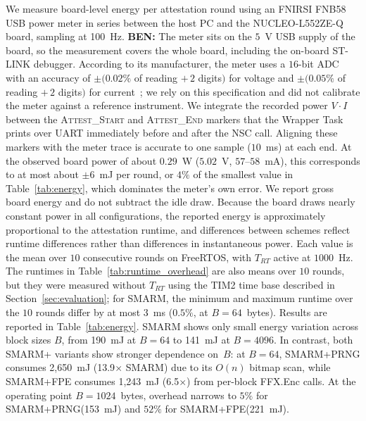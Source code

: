 \documentclass{ieeeaccess}
\DeclareRobustCommand{\ben}[1]{{\color{BENcolor}\textbf{BEN:} #1}}
\newcommand{\rtsmarm}{SMARM+\xspace}
\newcommand{\rtsmarmone}{SMARM+PRNG\xspace}
\newcommand{\rtsmarmtwo}{SMARM+FPE\xspace}
\begin{document}
We measure board-level energy per attestation round using 
an FNIRSI FNB58 USB power meter in series between the host 
PC and the NUCLEO-L552ZE-Q board, sampling at 100~Hz. 
\ben{The meter sits on the $5$~V USB supply of the board, so the measurement covers the whole board, including the on-board ST-LINK debugger.
According to its manufacturer, the meter uses a $16$-bit ADC with an accuracy of $\pm(0.02\%$ of reading $+\,2$ digits$)$ for voltage and $\pm(0.05\%$ of reading $+\,2$ digits$)$ for current~\cite{fnb58}; we rely on this specification and did not calibrate the meter against a reference instrument.
We integrate the recorded power $V \cdot I$ between the \textsc{Attest\_Start} and \textsc{Attest\_End} markers that the Wrapper Task prints over UART immediately before and after the NSC call.
Aligning these markers with the meter trace is accurate to one sample ($10$~ms) at each end.
At the observed board power of about $0.29$~W ($5.02$~V, $57$--$58$~mA), this corresponds to at most about $\pm 6$~mJ per round, or $4\%$ of the smallest value in Table~\ref{tab:energy}, which dominates the meter's own error.
We report gross board energy and do not subtract the idle draw.
Because the board draws nearly constant power in all configurations, the reported energy is approximately proportional to the attestation runtime, and differences between schemes reflect runtime differences rather than differences in instantaneous power.
Each value is the mean over $10$ consecutive rounds on FreeRTOS, with $T_{RT}$ active at $1000$~Hz.
The runtimes in Table~\ref{tab:runtime_overhead} are also means over $10$ rounds, but they were measured without $T_{RT}$ using the TIM2 time base described in Section~\ref{sec:evaluation}; for SMARM, the minimum and maximum runtime over the $10$ rounds differ by at most $3$~ms ($0.5\%$, at $B = 64$~bytes).}
%
Results are reported in Table~\ref{tab:energy}.
SMARM shows only small energy variation across block sizes $B$, from 190~mJ at $B=64$ to 141~mJ at $B=4096$.
In contrast, both \rtsmarm variants show stronger dependence on~$B$: 
at $B = 64$, \rtsmarmone consumes 2{,}650~mJ 
(13.9$\times$ SMARM) due to its $O(n)$ bitmap scan, 
while \rtsmarmtwo consumes 1{,}243~mJ (6.5$\times$) 
from per-block \textsf{FFX.Enc} calls.
At the operating point $B = 1024$~bytes, overhead 
narrows to $5\%$ for \rtsmarmone (153~mJ) and 
$52\%$ for \rtsmarmtwo (221~mJ).
\end{document}
